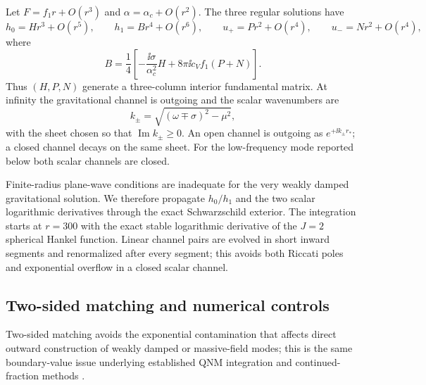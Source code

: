 Let $F=f_1r+O(r^3)$ and $\alpha=\alpha_c+O(r^2)$.  The three regular
solutions have
\begin{equation}
h_0=Hr^3+O(r^5),\qquad
h_1=Br^4+O(r^6),\qquad
u_+=Pr^2+O(r^4),\qquad u_-=Nr^2+O(r^4),
\end{equation}
where
\begin{equation}
B=\frac14\left[-\frac{\ii\sigma}{\alpha_c^2}H
+8\pi\ii c_V f_1(P+N)\right].
\label{eq:axial-frobenius-B}
\end{equation}
Thus $(H,P,N)$ generate a three-column interior fundamental matrix.  At
infinity the gravitational channel is outgoing and the scalar wavenumbers are
\begin{equation}
k_\pm=\sqrt{(\omega\mp\sigma)^2-\mu^2},
\label{eq:scalar-channel-k}
\end{equation}
with the sheet chosen so that $\operatorname{Im}k_\pm\geq0$.  An open channel
is outgoing as $e^{+\ii k_\pm r_*}$; a closed channel decays on the same
sheet.  For the low-frequency mode reported below both scalar channels are
closed.

Finite-radius plane-wave conditions are inadequate for the very weakly
damped gravitational solution.  We therefore propagate $h_0/h_1$ and the two
scalar logarithmic derivatives through the exact Schwarzschild exterior.
The integration starts at $r=300$ with the exact stable logarithmic derivative
of the $J=2$ spherical Hankel function.  Linear channel pairs are evolved in
short inward segments and renormalized after every segment; this avoids both
Riccati poles and exponential overflow in a closed scalar channel.

\subsection{Two-sided matching and numerical controls}

Two-sided matching avoids the exponential contamination that affects direct
outward construction of weakly damped or massive-field modes; this is the same
boundary-value issue underlying established QNM integration and continued-
fraction methods \cite{Leaver1985,KokkotasSchmidt1999}.

